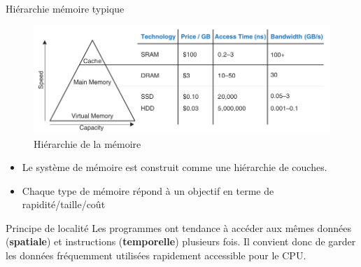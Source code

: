 \documentclass[10pt]{beamer}
\begin{document}
\begin{frame}{Hiérarchie mémoire typique}
    \begin{figure}
        \centering
        \includegraphics[width=.75\textwidth]{figures/memory_speed_HH.png}
        \caption{Hiérarchie de la mémoire \cite{harris2021digital}}
    \end{figure}

    \begin{itemize}
        \item Le système de mémoire est construit comme une hiérarchie de
              couches.
        \item Chaque type de m\'emoire r\'epond \`a un objectif en terme de
              rapidit\'e/taille/co\^ut
    \end{itemize}
    \begin{block}{Principe de localité}
        Les programmes ont tendance à accéder aux mêmes données
        (\textbf{spatiale}) et instructions (\textbf{temporelle}) plusieurs
        fois.
        Il convient donc de garder les données fréquemment utilisées rapidement
        accessible pour le CPU.
    \end{block}
\end{frame}
\end{document}
